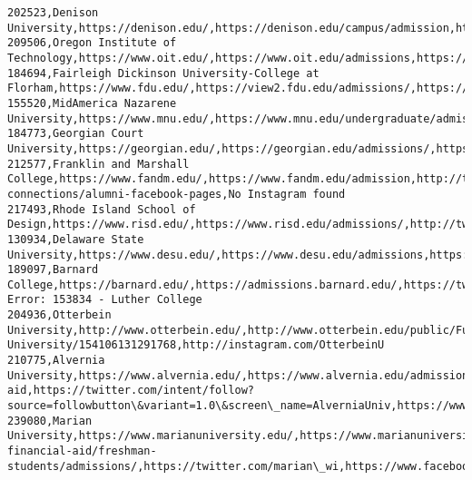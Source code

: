 \documentclass[11pt]{article}
\begin{document}
\begin{Verbatim}[commandchars=\\\{\}]
202523,Denison University,https://denison.edu/,https://denison.edu/campus/admission,https://twitter.com/denisonu,https://www.facebook.com/denisonuniversity,https://www.instagram.com/denisonu
209506,Oregon Institute of Technology,https://www.oit.edu/,https://www.oit.edu/admissions,https://twitter.com/OregonTech,https://www.facebook.com/OregonTech,https://www.instagram.com/oregontech/
184694,Fairleigh Dickinson University-College at Florham,https://www.fdu.edu/,https://view2.fdu.edu/admissions/,https://twitter.com/FDUWhatsNew,https://www.facebook.com/fairleighdickinsonuniversity,https://instagram.com/fduwhatsnew\#
155520,MidAmerica Nazarene University,https://www.mnu.edu/,https://www.mnu.edu/undergraduate/admissions,http://twitter.com/followMNU,https://www.facebook.com/MNUPioneers/,https://www.instagram.com/mnupioneers/
184773,Georgian Court University,https://georgian.edu/,https://georgian.edu/admissions/,https://twitter.com/Georgiancourt,https://www.facebook.com/georgiancourtu/,https://www.instagram.com/georgiancourt/
212577,Franklin and Marshall College,https://www.fandm.edu/,https://www.fandm.edu/admission,http://twitter.com/FandMCollege,/alumni-connections/alumni-facebook-pages,No Instagram found
217493,Rhode Island School of Design,https://www.risd.edu/,https://www.risd.edu/admissions/,http://twitter.com/risd,http://facebook.com/risd1877,https://www.instagram.com/risd1877/
130934,Delaware State University,https://www.desu.edu/,https://www.desu.edu/admissions,https://twitter.com/DelStateUniv,https://www.facebook.com/DESUedu,http://instagram.com/delstateuniv
189097,Barnard College,https://barnard.edu/,https://admissions.barnard.edu/,https://twitter.com/BarnardCollege,https://www.facebook.com/barnardcollege,http://instagram.com/barnardcollege
Error: 153834 - Luther College
204936,Otterbein University,http://www.otterbein.edu/,http://www.otterbein.edu/public/FutureStudents/Undergraduate/AdmissionCounselors.aspx,http://twitter.com/otterbein,http://www.facebook.com/pages/Otterbein-University/154106131291768,http://instagram.com/OtterbeinU
210775,Alvernia University,https://www.alvernia.edu/,https://www.alvernia.edu/admissions-aid,https://twitter.com/intent/follow?source=followbutton\&variant=1.0\&screen\_name=AlverniaUniv,https://www.facebook.com/AlverniaUniversity,https://instagram.com/alverniauniversity
239080,Marian University,https://www.marianuniversity.edu/,https://www.marianuniversity.edu/admission-financial-aid/freshman-students/admissions/,https://twitter.com/marian\_wi,https://www.facebook.com/marianuniversitywi,https://www.instagram.com/marianuniversitywi/

\end{Verbatim}
\end{document}
